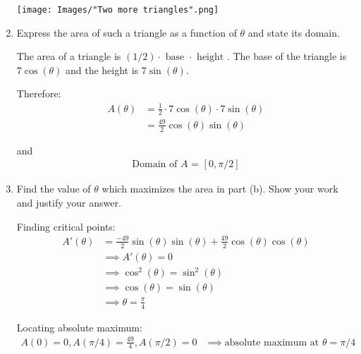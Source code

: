\documentclass[nooutcomes]{ximera}
\begin{document}
\begin{problem}
\begin{enumerate}
\begin{freeResponse}
  \begin{image}
    \texttt{[image: Images/"Two more triangles".png]}
      \end{image}
 
      \end{freeResponse}

    \item
      Express the area of such a triangle as a function of $\theta$ and state its domain.
      \begin{freeResponse}
        The area of a triangle is $(1/2)\cdot\mbox{ base } \cdot \mbox{ height }$.
        The base of the triangle is $7\cos(\theta)$ and the height is $7\sin(\theta)$.

        Therefore:
        \begin{align*}
          A(\theta) &= \frac{1}{2}\cdot 7\cos(\theta) \cdot 7\sin(\theta)\\
                    &= \frac{49}{2}\cos(\theta)\sin(\theta)
        \end{align*}

        and
        \begin{align*}
          \mbox{Domain of $A$ = $[0,\pi/2]$}
        \end{align*}
      \end{freeResponse}

    \item
      Find the value of $\theta$ which maximizes the area in part (b).
      Show your work and justify your answer.
      \begin{freeResponse}
        Finding critical points:
        \begin{align*}
          A'(\theta) &= \frac{-49}{2} \sin(\theta)\sin(\theta) + \frac{49}{2}\cos(\theta)\cos(\theta) \\
          &\implies A'(\theta) = 0\\
          &\implies \cos^2(\theta) = \sin^2(\theta)\\
          &\implies \cos(\theta) = \sin(\theta)\\
          &\implies \theta = \frac{\pi}{4}
        \end{align*}

        Locating absolute maximum:
        \begin{align*}
          A(0) = 0, A(\pi/4) = \frac{49}{4}, A(\pi/2) = 0 &\implies \mbox{absolute maximum at $\theta = \pi/4$}
        \end{align*}
      \end{freeResponse}
  \end{enumerate}
\end{problem}
\end{document}
